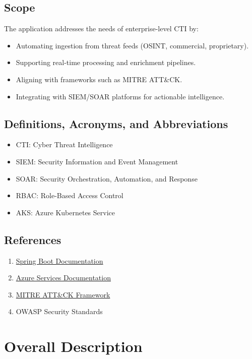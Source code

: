 \documentclass[12pt]{article}
\begin{document}
\subsection{Scope}
The application addresses the needs of enterprise-level CTI by:
\begin{itemize}
    \item Automating ingestion from threat feeds (OSINT, commercial, proprietary).
    \item Supporting real-time processing and enrichment pipelines.
    \item Aligning with frameworks such as MITRE ATT&CK.
    \item Integrating with SIEM/SOAR platforms for actionable intelligence.
\end{itemize}

\subsection{Definitions, Acronyms, and Abbreviations}
\begin{itemize}
    \item CTI: Cyber Threat Intelligence
    \item SIEM: Security Information and Event Management
    \item SOAR: Security Orchestration, Automation, and Response
    \item RBAC: Role-Based Access Control
    \item AKS: Azure Kubernetes Service
\end{itemize}

\subsection{References}
\begin{enumerate}
    \item \href{https://spring.io/projects/spring-boot}{Spring Boot Documentation}
    \item \href{https://azure.microsoft.com/}{Azure Services Documentation}
    \item \href{https://attack.mitre.org/}{MITRE ATT&CK Framework}
    \item OWASP Security Standards
\end{enumerate}

\section{Overall Description}
\end{document}
